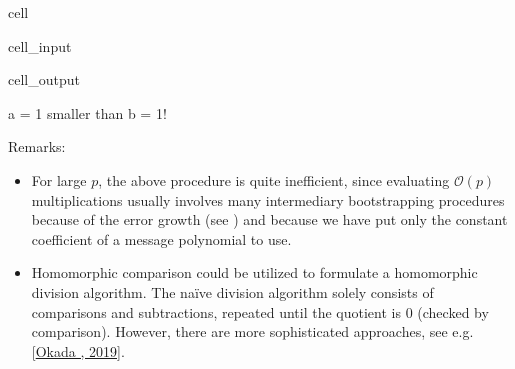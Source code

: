 \documentclass[letterpaper,10pt,english]{jupyterBook}
\begin{document}
\begin{sphinxuseclass}{cell}
\begin{sphinxVerbatimInput}
\begin{sphinxuseclass}{cell_input}
\end{sphinxuseclass}\end{sphinxVerbatimInput}
\begin{sphinxVerbatimOutput}

\begin{sphinxuseclass}{cell_output}
\begin{sphinxVerbatim}[commandchars=\\\{\}]
a = \PYGZhy{}1 smaller than b = 1!
\end{sphinxVerbatim}

\end{sphinxuseclass}\end{sphinxVerbatimOutput}

\end{sphinxuseclass}
\sphinxAtStartPar
Remarks:
\begin{itemize}
\item {} 
\sphinxAtStartPar
For large \(p\), the above procedure is quite inefficient, since evaluating \(\mathcal O(p)\) multiplications usually involves many intermediary bootstrapping procedures because of the error growth (see {\hyperref[\detokenize{Thesis:error-after-BFV-multiplication}]{}}) and because we have put only the constant coefficient of a message polynomial to use.

\item {} 
\sphinxAtStartPar
Homomorphic comparison could be utilized to formulate a homomorphic division algorithm.
The naïve division algorithm solely consists of comparisons and subtractions, repeated until the quotient is \(0\) (checked by comparison).
However, there are more sophisticated approaches, see e.g. {[}\hyperlink{cite.Thesis:id78}{Okada , 2019}{]}.

\end{itemize}

\begin{DUlineblock}{0em}
\item[] 
\end{DUlineblock}
\end{document}
